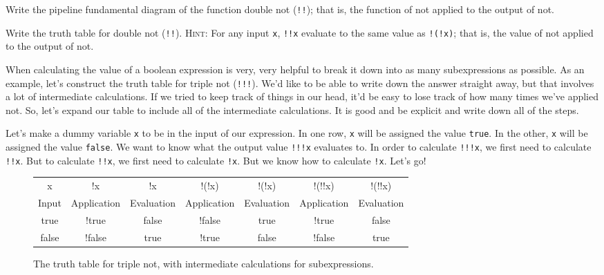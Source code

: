 \begin{question}
Write the pipeline fundamental diagram of the function double \textsf{not}
(\texttt{!!}); that is, the function of \textsf{not} applied to the output of
\textsf{not}.
\end{question}

\begin{question}
Write the truth table for double \textsf{not} (\texttt{!!}). \textsc{Hint:} For
any input \texttt{x}, \texttt{!!x} evaluate to the same value as \texttt{!(!x)};
that is, the value of \textsf{not} applied to the output of \textsf{not}.
\end{question}

When calculating the value of a boolean expression is very, very helpful to
break it down into as many subexpressions as possible. As an example, let's
construct the truth table for triple \textsf{not} (\texttt{!!!}). We'd like to
be able to write down the answer straight away, but that involves a lot of
intermediate calculations. If we tried to keep track of things in our head, it'd
be easy to lose track of how many times we've applied \textsf{not}. So, let's
expand our table to include all of the intermediate calculations.
 It
is good and be explicit and write down all of the steps.

Let's make a dummy variable \texttt{x} to be in the input of our expression. In
one row, \texttt{x} will be assigned the value \texttt{true}. In the other,
\texttt{x} will be assigned the value \texttt{false}. We want to know what the
output value \texttt{!!!x} evaluates to. In order to calculate \texttt{!!!x}, we
first need to calculate \texttt{!!x}. But to calculate \texttt{!!x}, we first
need to calculate \texttt{!x}. But we know how to calculate \texttt{!x}. Let's
go!

\begin{figure*}[h]
  \ttfamily
  \color{cyan}
  \small
  \begin{tabular}{c c c c c c c}
    x & !x & !x & !(!x) & !(!x) & !(!!x) & !(!!x) \\
\textsf{Input} & \textsf{Application} & \textsf{Evaluation} &
\textsf{Application} & \textsf{Evaluation} & \textsf{Application} &
\textsf{Evaluation}\\
    \hline
    true & !true & false & !false & true & !true & false\\
    false & !false & true & !true & false & !false & true
  \end{tabular}
\caption{\label{fig:conditional-triple-not-table}The truth table for triple
\textsf{not}, with intermediate calculations for subexpressions.}
\end{figure*}

